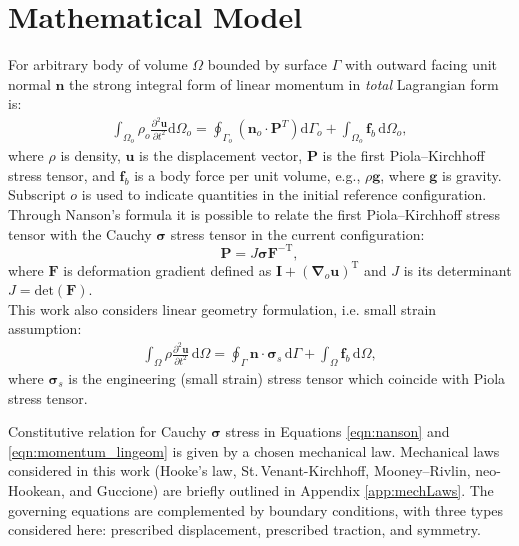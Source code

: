 \documentclass[sn-mathphys,Numbered]{sn-jnl}%
\newcommand{\bb}{\boldsymbol}
\begin{document}
\section{Mathematical Model}
\label{sec:math_model}
%
%
For arbitrary body of volume $\Omega$ bounded by surface $\Gamma$ with outward facing unit normal $\bb{n}$
the strong integral form of linear momentum in \emph{total} Lagrangian form is:
%
\begin{eqnarray} \label{eqn:momentum_TL}
     \int_{\Omega_o} \rho_o \frac{\partial^2 \bb{u} }{\partial t^2} \text{d}\Omega_o
     =
     \oint_{\Gamma_o} \left( \bb{n}_o \cdot  \bb{P}^T\right)  \text{d}\Gamma_o
     + \int_{\Omega_o}  \bb{f}_b \, \text{d}\Omega_o,
\end{eqnarray}
%
where $\rho$ is density, $\bb{u}$ is the displacement vector, $\bb{P}$ is the first Piola–Kirchhoff stress tensor,
and $\bb{f}_b$ is a body force per unit volume, e.g., $\rho \bb{g}$, where $\bb{g}$ is gravity.
Subscript $o$ is used to indicate quantities in the initial reference configuration.
Through Nanson's formula it is possible to relate the first Piola–Kirchhoff stress tensor with the Cauchy $\bb{\sigma}$ stress tensor in the current configuration:
%
\begin{equation} \label{eqn:nanson}
\bb{P}=J \bb{\sigma} \bb{F}^{-\text{T}},
\end{equation} 
%
where $\bb{F}$ is deformation gradient defined as $\textbf{I} + (\bb{\nabla}_o \bb{u})^{\text{T}}$ and $J$ is its determinant $J = \text{det}(\bb{F})$.
\\
This work also considers linear geometry formulation, i.e. small strain assumption:
%
\begin{eqnarray} \label{eqn:momentum_lingeom}
    \int_{\Omega} \rho \frac{\partial^2 \bb{u} }{\partial t^2} \, \text{d}\Omega
     =
     \oint_{\Gamma} \bb{n} \cdot \bb{\sigma}_s \,  \text{d}\Gamma
     + \int_{\Omega}  \bb{f}_b \, \text{d}\Omega,
\end{eqnarray}
%
where $\bb{\sigma}_s$ is the engineering (small strain) stress tensor which coincide with Piola stress tensor.

Constitutive relation for Cauchy $\bb{\sigma}$ stress in Equations \ref{eqn:nanson} and \ref{eqn:momentum_lingeom} is given by a chosen mechanical law. 
Mechanical laws considered in this work (Hooke's law, St.\,Venant-Kirchhoff, Mooney–Rivlin, neo-Hookean, and Guccione) are briefly outlined in Appendix \ref{app:mechLaws}.
The governing equations are complemented by boundary conditions, with three types considered here: prescribed displacement, prescribed traction, and symmetry.
%
%      
\end{document}

